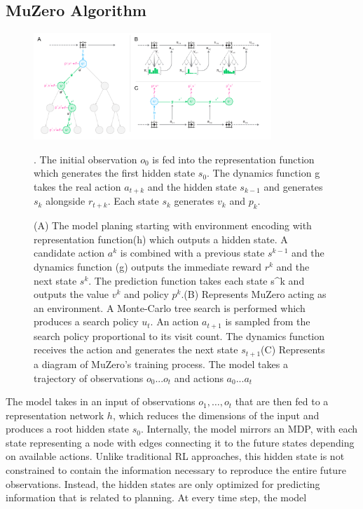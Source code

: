 \subsection{MuZero Algorithm}
\begin{figure}[t]
    \centering
    \includegraphics[width=0.8\textwidth]{sections/6MuZero/graph_1.png}
    \caption{(A) The model planing starting with environment encoding with representation function(h) which outputs a hidden state. A candidate action $a^{k}$ is combined with a previous state $s^{k-1}$ and the dynamics function (g) outputs the immediate reward $r^{k}$ and the next state $s^{k}$. The prediction function takes each state s^{k} and outputs the value $v^{k}$ and policy $p^{k}$.(B) Represents MuZero acting as an environment. A Monte-Carlo tree search is performed which produces a search policy $u_t$. An action $a_{t+1}$ is sampled from the search policy proportional to its visit count. The dynamics function receives the action and generates the next state $s_{t+1}$(C) Represents a diagram of MuZero's training process. The model takes a trajectory of observations $o_0$...$o_t$ and actions $a_0$...$a_t$}. The initial observation $o_0$ is fed into the representation function which generates the first hidden state $s_0$. The dynamics function g takes the real action $a_{t+k}$ and the hidden state $s_{k-1}$ and generates $s_{k}$ alongside $r_{t+k}$. Each state $s_k$ generates $v_k$ and $p_k$.
\end{figure}
The model takes in an input of observations $o_1, \ldots, o_t$ that are then fed to a representation network $h$,
which reduces the dimensions of the input and produces a root hidden state $s_0$. Internally, the model
mirrors an MDP, with each state representing a node with edges connecting it to the future states
depending on available actions. Unlike traditional RL approaches, this hidden state is not constrained to
contain the information necessary to reproduce the entire future observations. Instead, the hidden states
are only optimized for predicting information that is related to planning. At every time step, the model
